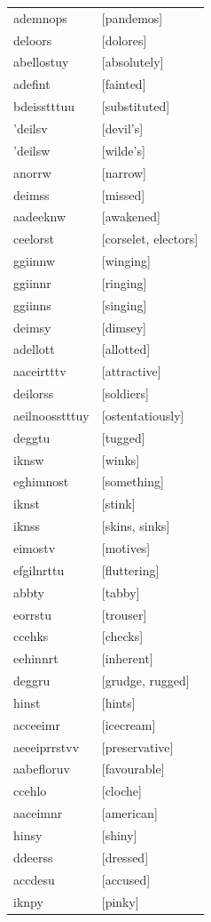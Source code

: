 \documentclass{article}
\begin{document}
\begin{tabular}{ll}
ademnops & [pandemos] \\
deloors & [dolores] \\
abellostuy & [absolutely] \\
adefint & [fainted] \\
bdeisstttuu & [substituted] \\
'deilsv & [devil's] \\
'deilsw & [wilde's] \\
anorrw & [narrow] \\
deimss & [missed] \\
aadeeknw & [awakened] \\
ceelorst & [corselet, electors] \\
ggiinnw & [winging] \\
ggiinnr & [ringing] \\
ggiinns & [singing] \\
deimsy & [dimsey] \\
adellott & [allotted] \\
aaceirtttv & [attractive] \\
deilorss & [soldiers] \\
aeilnoosstttuy & [ostentatiously] \\
deggtu & [tugged] \\
iknsw & [winks] \\
eghimnost & [something] \\
iknst & [stink] \\
iknss & [skins, sinks] \\
eimostv & [motives] \\
efgilnrttu & [fluttering] \\
abbty & [tabby] \\
eorrstu & [trouser] \\
ccehks & [checks] \\
eehinnrt & [inherent] \\
deggru & [grudge, rugged] \\
hinst & [hints] \\
acceeimr & [icecream] \\
aeeeiprrstvv & [preservative] \\
aabefloruv & [favourable] \\
ccehlo & [cloche] \\
aaceimnr & [american] \\
hinsy & [shiny] \\
ddeerss & [dressed] \\
accdesu & [accused] \\
iknpy & [pinky] \\

\end{tabular}
\end{document}
